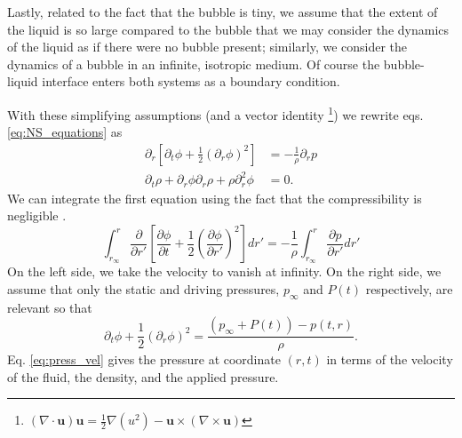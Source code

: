 \documentclass[prb,aps,nofootinbib,superscriptaddress,floatfix]{revtex4-2}
\begin{document}
Lastly, related to the fact that the bubble is tiny, we assume that the extent of the liquid is so large compared to the bubble that we may consider the dynamics of the liquid as if there were no bubble present; similarly, we consider the dynamics of a bubble in an infinite, isotropic medium. Of course the bubble-liquid interface enters both systems as a boundary condition. 

With these simplifying assumptions (and a vector identity \footnote{$\left( \nabla \cdot \bm{u} \right) \bm{u} = \frac{1}{2} \nabla (u^2) - \bm{u}\times \left( \nabla \times \bm{u} \right)$}) we rewrite eqs. \ref{eq:NS_equations} as 
\begin{equation}
\begin{split}
     \partial_r \left[ \partial_t \phi +\frac{1}{2} \left( \partial_r \phi \right)^2 \right] & = - \frac{1}{\rho} \partial_r p  \\ 
     \partial_t \rho+ \partial_r \phi \partial_r \rho + \rho \partial^2_r \phi & = 0.
     \label{eq:NS_1D}
\end{split}
\end{equation}
We can integrate the first equation using the fact that the compressibility is negligible \cite{leighton2007derivation}.
\begin{equation}
    \int_{r_\infty}^{r} \frac{\partial}{\partial r'} \left[ \frac{\partial \phi}{\partial t} +\frac{1}{2} \left( \frac{\partial \phi}{\partial r'} \right)^2 \right] dr' = - \frac{1}{\rho} \int_{r_\infty}^{r} \frac{\partial p}{\partial r'} dr'
\end{equation}
On the left side, we take the velocity to vanish at infinity. On the right side, we assume that only the static and driving pressures, $p_\infty$ and $P(t)$ respectively, are relevant so that \cite{prosperetti1999old,prosperetti1986bubble,leighton2007derivation} 
\begin{equation}
    \partial_t \phi + \frac{1}{2}\left( \partial_r \phi \right)^2 = \frac{(p_\infty+P(t))-p(t,r)}{\rho}.
    \label{eq:press_vel}
\end{equation}
Eq. \ref{eq:press_vel} gives the pressure at coordinate $(r,t)$ in terms of the velocity of the fluid, the density, and the applied pressure. 
\end{document}
